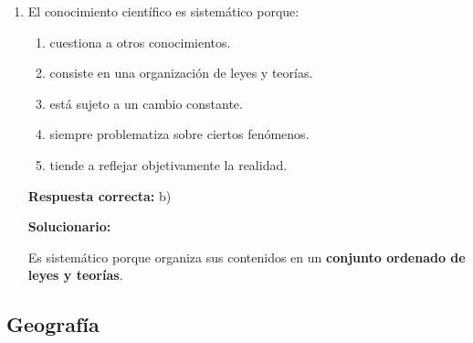 \begin{enumerate}[resume]
	\vspace{2mm}
	\textbf{Solucionario:}
	
	Sustentar una tesis exige comprender, analizar, argumentar y explicar; eso corresponde al aprendizaje \textbf{cognitivo}.
	
	\vspace{6mm}
	
	\item El conocimiento científico es sistemático porque:
	
	\begin{enumerate}[label=\alph*)]
		\item cuestiona a otros conocimientos.
		\item consiste en una organización de leyes y teorías.
		\item está sujeto a un cambio constante.
		\item siempre problematiza sobre ciertos fenómenos.
		\item tiende a reflejar objetivamente la realidad.
	\end{enumerate}
	\textbf{Respuesta correcta:} b)
	
	\vspace{2mm}
	\textbf{Solucionario:}
	
	Es sistemático porque organiza sus contenidos en un \textbf{conjunto ordenado de leyes y teorías}.
	
	\vspace{6mm}
	
\end{enumerate}

\subsection*{Geografía}

